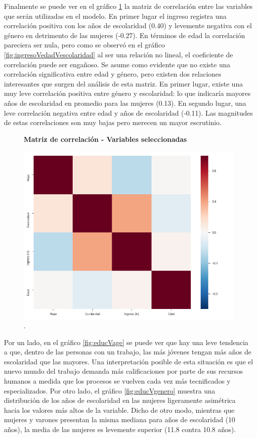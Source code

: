 Finalmente se puede ver en el gráfico \ref{fig:coormatrix} la matriz de correlación entre las variables que serán utilizadas en el modelo. En primer lugar el ingreso registra una correlación positiva con los años de escolaridad (0.40) y levemente negativa con el género en detrimento de las mujeres (-0.27). En términos de edad la correlación pareciera ser nula, pero como se observó en el gráfico \ref{fig:ingresoVedadVescolaridad} al ser una relación no lineal, el coeficiente de correlación puede ser engañoso. Se asume como evidente que no existe una correlación significativa entre edad y género, pero existen dos relaciones interesantes que surgen del análisis de esta matriz. En primer lugar, existe una muy leve correlación positiva entre género y escolaridad: lo que indicaría mayores años de escolaridad en promedio para las mujeres (0.13). En segundo lugar, una leve correlación negativa entre edad y años de escolaridad (-0.11). Las magnitudes de estas correlaciones son muy bajas pero merecen un mayor escrutinio. 


 
  \begin{figure}[!htb]
  	\centering
  	\textbf{Matriz de correlación - Variables seleccionadas}\par\medskip
  	\includegraphics[scale = 0.4]{../img/capitulo3/corrMatrix.png}
  	\caption{.}
  	\label{fig:coormatrix}
  \end{figure}
  
Por un lado, en el gráfico \ref{fig:educVage} se puede ver que hay una leve tendencia a que, dentro de las personas con un trabajo, las más jóvenes tengan más años de escolaridad que las mayores. Una interpretación posible de esta situación es que el nuevo mundo del trabajo demanda más calificaciones por parte de sus recursos humanos a medida que los procesos se vuelven cada vez más tecnificados y especializados. Por otro lado, el gráfico \ref{fig:educVgenero} muestra una distribución de los años de escolaridad en las mujeres ligeramente asimétrica hacia los valores más altos de la variable. Dicho de otro modo, mientras que mujeres y varones presentan la misma mediana para años de escolaridad (10 años), la media de las mujeres es levemente superior (11.8 contra 10.8 años).
  
